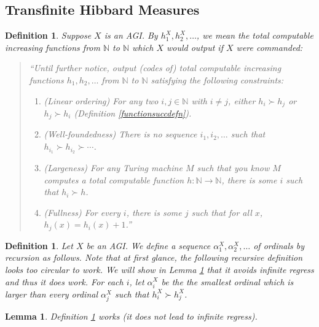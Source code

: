 \documentclass{article}
\newtheorem{definition}[theorem]{Definition}
\newtheorem{lemma}[theorem]{Lemma}
\begin{document}
\subsection{Transfinite Hibbard Measures}

\begin{definition}
\label{fairsequencedefn}
    Suppose $X$ is an AGI. By $h^X_1,h^X_2,\ldots$, we mean the total computable
    increasing functions
    from $\mathbb N$ to $\mathbb N$ which $X$ would output if $X$ were commanded:
    \begin{quote}
        ``Until further notice, output (codes of) total computable increasing
        functions $h_1,h_2,\ldots$ from $\mathbb N$ to $\mathbb N$ satisfying the
        following constraints:
        \begin{enumerate}
            \item (Linear ordering) For any two $i,j\in\mathbb N$ with $i\neq j$, either
            $h_i\succ h_j$ or $h_j\succ h_i$ (Definition \ref{functionsuccdefn}).
            \item (Well-foundedness) There is no sequence $i_1,i_2,\ldots$ such that
            $h_{i_1}\succ h_{i_2}\succ\cdots$.
            \item (Largeness) For any Turing machine $M$ such that you know
            $M$ computes a total computable function $h:\mathbb N\to\mathbb N$,
            there is some $i$ such that $h_i\succ h$.
            \item (Fullness)
            For every $i$, there is some $j$ such that for all $x$,
            $h_j(x)=h_i(x)+1$.''
        \end{enumerate}
    \end{quote}
\end{definition}

\begin{definition}
\label{alphaidefn}
    Let $X$ be an AGI. We define a sequence $\alpha^X_1,\alpha^X_2,\ldots$
    of ordinals by recursion as follows. Note that at first glance,
    the following recursive definition looks too circular to work.
    We will show in Lemma \ref{transfiniterecursionmagiclemma} that
    it avoids infinite regress and thus
    it does work. For each $i$, let $\alpha^X_i$ be the the smallest
    ordinal which is larger than every ordinal $\alpha^X_j$ such that
    $h^X_i\succ h^X_j$.
\end{definition}

\begin{lemma}
\label{transfiniterecursionmagiclemma}
    Definition \ref{alphaidefn} works (it does not lead to infinite regress).
\end{lemma}
\end{document}
